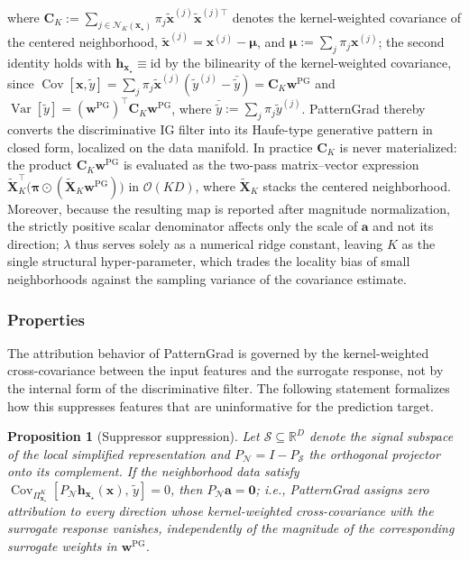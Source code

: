 \documentclass[pdflatex,sn-mathphys-num]{sn-jnl}
\theoremstyle{thmstyleone}
\newtheorem{proposition}[theorem]{Proposition}
\theoremstyle{thmstyletwo}%
\theoremstyle{thmstylethree}%
\begin{document}
where $\mathbf{C}_K \mathrel{:=} \sum_{j \in \mathcal{N}_K(\mathbf{x}_\star)} \pi_j \tilde{\mathbf{x}}^{(j)} \tilde{\mathbf{x}}^{(j)\top}$ denotes the kernel-weighted covariance of the centered neighborhood, $\tilde{\mathbf{x}}^{(j)} = \mathbf{x}^{(j)} - \boldsymbol{\mu}$, and $\boldsymbol{\mu} \mathrel{:=} \sum_j \pi_j \mathbf{x}^{(j)}$; the second identity holds with $\mathbf{h}_{\mathbf{x}_\star} \equiv \mathrm{id}$ by the bilinearity of the kernel-weighted covariance, since $\operatorname{Cov}[\mathbf{x}, \tilde{y}] = \sum_j \pi_j \tilde{\mathbf{x}}^{(j)} (\tilde{y}^{(j)} - \bar{\tilde{y}}) = \mathbf{C}_K \mathbf{w}^{\text{PG}}$ and $\operatorname{Var}[\tilde{y}] = (\mathbf{w}^{\text{PG}})^\top \mathbf{C}_K \mathbf{w}^{\text{PG}}$, where $\bar{\tilde{y}} \mathrel{:=} \sum_j \pi_j \tilde{y}^{(j)}$. PatternGrad thereby converts the discriminative IG filter into its Haufe-type generative pattern \cite{haufe2014} in closed form, localized on the data manifold. In practice $\mathbf{C}_K$ is never materialized: the product $\mathbf{C}_K \mathbf{w}^{\text{PG}}$ is evaluated as the two-pass matrix--vector expression $\tilde{\mathbf{X}}_K^\top \big(\boldsymbol{\pi} \odot (\tilde{\mathbf{X}}_K \mathbf{w}^{\text{PG}})\big)$ in $\mathcal{O}(KD)$, where $\tilde{\mathbf{X}}_K$ stacks the centered neighborhood. Moreover, because the resulting map is reported after magnitude normalization, the strictly positive scalar denominator affects only the scale of $\mathbf{a}$ and not its direction; $\lambda$ thus serves solely as a numerical ridge constant, leaving $K$ as the single structural hyper-parameter, which trades the locality bias of small neighborhoods against the sampling variance of the covariance estimate.

\subsubsection{Properties}

The attribution behavior of PatternGrad is governed by the kernel-weighted cross-covariance between the input features and the surrogate response, not by the internal form of the discriminative filter. The following statement formalizes how this suppresses features that are uninformative for the prediction target.

\begin{proposition}[Suppressor suppression]\label{prop:suppression}
Let $\mathcal{S} \subseteq \mathbb{R}^{D}$ denote the signal subspace of the local simplified representation and $P_{\mathcal{N}} = I - P_{\mathcal{S}}$ the orthogonal projector onto its complement. If the neighborhood data satisfy $\operatorname{Cov}_{\Pi^K_{\mathbf{x}_\star}}\!\left[P_{\mathcal{N}}\mathbf{h}_{\mathbf{x}_\star}(\mathbf{x}),\, \tilde{y}\right] = 0$, then $P_{\mathcal{N}}\mathbf{a} = \mathbf{0}$; i.e., PatternGrad assigns zero attribution to every direction whose kernel-weighted cross-covariance with the surrogate response vanishes, independently of the magnitude of the corresponding surrogate weights in $\mathbf{w}^{\text{PG}}$.
\end{proposition}
\end{document}
